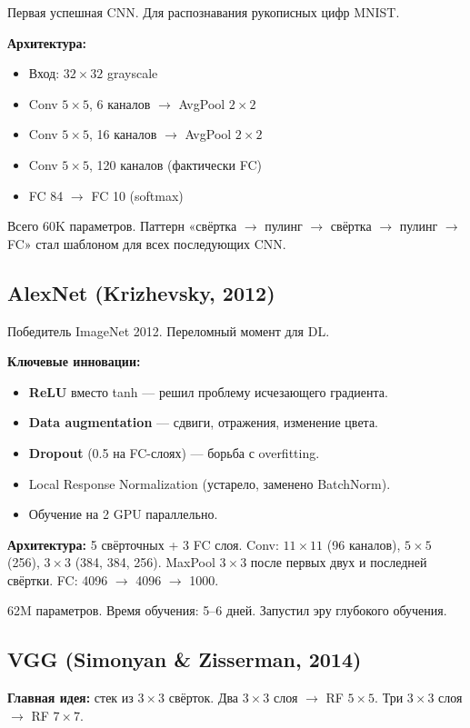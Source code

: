 \documentclass[a4paper,12pt]{article}
\begin{document}
Первая успешная CNN. Для распознавания рукописных цифр MNIST.

\textbf{Архитектура:}
\begin{itemize}
    \item Вход: $32 \times 32$ grayscale
    \item Conv $5\times5$, 6 каналов $\to$ AvgPool $2\times2$
    \item Conv $5\times5$, 16 каналов $\to$ AvgPool $2\times2$
    \item Conv $5\times5$, 120 каналов (фактически FC)
    \item FC 84 $\to$ FC 10 (softmax)
\end{itemize}

Всего 60K параметров. Паттерн «свёртка $\to$ пулинг $\to$ свёртка $\to$ пулинг $\to$ FC» стал шаблоном для всех последующих CNN.

\subsection{AlexNet (Krizhevsky, 2012)}

Победитель ImageNet 2012. Переломный момент для DL.

\textbf{Ключевые инновации:}
\begin{itemize}
    \item \textbf{ReLU} вместо tanh — решил проблему исчезающего градиента.
    \item \textbf{Data augmentation} — сдвиги, отражения, изменение цвета.
    \item \textbf{Dropout} (0.5 на FC-слоях) — борьба с overfitting.
    \item Local Response Normalization (устарело, заменено BatchNorm).
    \item Обучение на 2 GPU параллельно.
\end{itemize}

\textbf{Архитектура:} 5 свёрточных + 3 FC слоя. Conv: $11\times11$ (96 каналов), $5\times5$ (256), $3\times3$ (384, 384, 256). MaxPool $3\times3$ после первых двух и последней свёртки. FC: 4096 $\to$ 4096 $\to$ 1000.

62M параметров. Время обучения: 5--6 дней. Запустил эру глубокого обучения.

\subsection{VGG (Simonyan \& Zisserman, 2014)}

\textbf{Главная идея:} стек из $3\times3$ свёрток. Два $3\times3$ слоя $\to$ RF $5\times5$. Три $3\times3$ слоя $\to$ RF $7\times7$.
\end{document}
